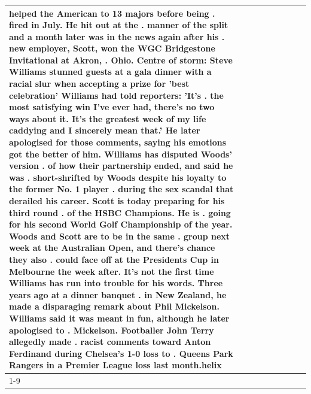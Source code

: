 \begin{table}[H]
\begin{tabular}{lllrlllll}
helped the American to 13 majors before being . fired in July. He hit out at the . manner of the split and a month later was in the news again after his . new employer, Scott, won the WGC Bridgestone Invitational at Akron, . Ohio. Centre of storm: Steve Williams stunned guests at a gala dinner with a racial slur when accepting a prize for 'best celebration' Williams had told reporters: 'It's . the most satisfying win I've ever had, there's no two ways about it. It's the greatest week of my life caddying and I sincerely mean that.' He later apologised for those comments, saying his emotions got the better of him. Williams has disputed Woods' version . of how their partnership ended, and said he was . short-shrifted by Woods despite his loyalty to the former No. 1 player . during the sex scandal that derailed his career. Scott is today preparing for his third round . of the HSBC Champions. He is . going for his second World Golf Championship of the year. Woods and Scott are to be in the same . group next week at the Australian Open, and there's chance they also . could face off at the Presidents Cup in Melbourne the week after. It's not the first time Williams has run into trouble for his words. Three years ago at a dinner banquet . in New Zealand, he made a disparaging remark about Phil Mickelson. Williams said it was meant in fun, although he later apologised to . Mickelson. Footballer John Terry allegedly made . racist comments toward Anton Ferdinand during Chelsea's 1-0 loss to . Queens Park Rangers in a Premier League loss last month.helix \\
\cline{1-9}

\end{tabular}
\end{table}
